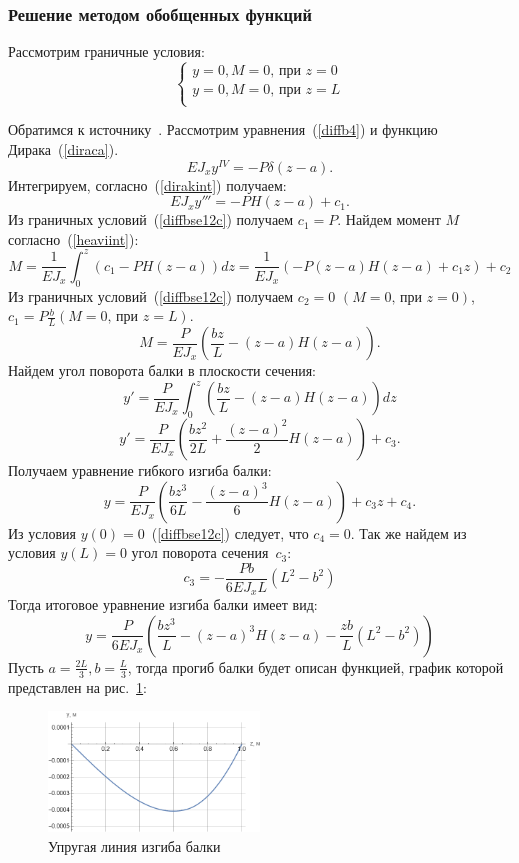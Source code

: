\documentclass[12pt, a4paper]{article}
\begin{document}
\subsubsection{Решение методом обобщенных функций}
Рассмотрим граничные условия:
\begin{equation}
	\label{diffbse12c}
	\begin{cases}
		y = 0, M = 0 \mbox{, при } z = 0\\
		y = 0, M = 0 \mbox{, при } z = L\\
	\end{cases}
\end{equation}

Обратимся к источнику~\cite{Birger}.
Рассмотрим уравнения~(\ref{diffb4}) и функцию Дирака~(\ref{diraca}). 
\[
	E J_{x} y^{IV} = - P \delta \left(z - a\right).
\]
Интегрируем, согласно~(\ref{dirakint}) получаем:
\[
	\label{z12213}
	E J_{x} y''' = - P H \left(z - a\right) + c_1.
\]
Из граничных условий~(\ref{diffbse12c}) получаем $c_1 = P$.
Найдем момент $M$ согласно~(\ref{heaviint}):
\[
	\label{z121334}
	M = \frac{1}{E J_{x}} \int_0^z  \left(c_1 - P H \left(z - a \right) \right) dz = \frac{1}{E J_{x}} \left( - P \left(z - a\right) H \left(z - a\right) + c_1 z \right) + c_2
\]
Из граничных условий~(\ref{diffbse12c}) получаем $c_2 = 0$ $\left(M = 0\mbox{, при } z = 0\right)$, $c_1 = P\frac{b}{L} \left(M = 0\mbox{, при } z = L\right)$.
\[
	M = \frac{P}{E J_{x}} \left( \frac{b z}{L} - \left(z - a\right) H \left(z - a\right)\right).
\]
Найдем угол поворота балки в плоскости сечения:
\[
	\label{z1213}
	y' = \frac{P}{E J_{x}} \int_0^z \left( \frac{b z}{L} - \left(z - a\right) H \left(z - a\right)\right) dz
\]
\[
    y' = \frac{P}{E J_{x}} \left( \frac{b z ^ 2}{2 L} + \frac{\left(z - a\right)^2}{2}
H \left(z - a\right) \right) + c_3.
\]
Получаем уравнение гибкого изгиба балки:
\[
	y = \frac{P}{E J_{x}}
	 \left(\frac{b z^3}{6 L} -
	 \frac{\left(z - a\right)^3}{6} H \left(z - a\right) \right)
	  + c_3 z + c_4.
\]
Из условия $y(0) = 0$~(\ref{diffbse12c}) следует, что $c_4 = 0$. Так же найдем из условия $y(L) = 0$ угол поворота сечения~$c_3\colon$
\[
	c_3 =  - \frac {P b} {6 E J_{x} L} \left(L^{2} - b^2\right)
\]
Тогда итоговое уравнение изгиба балки имеет вид:
\begin{equation}
	\label{z2ob}
	y = \frac{P}{6 E J_{x}} \left(\frac{b z^3}{L} - \left(z - a\right)^3 H\left(z - a\right) - \frac{z b}{L} \left(L^{2} - b^2\right)\right)
\end{equation}
\newpage
Пусть $a = \frac{2 L}{3}, b = \frac{L}{3}$, тогда прогиб балки будет описан функцией, график которой представлен на рис.~\ref{g4}:
\begin{figure}[!h]
	\centering
	\includegraphics[width=0.5\textwidth]{g.4}%
	\caption{Упругая линия изгиба балки}
	\vspace*{-2mm}
	\label{g4}
\end{figure}
\end{document}
